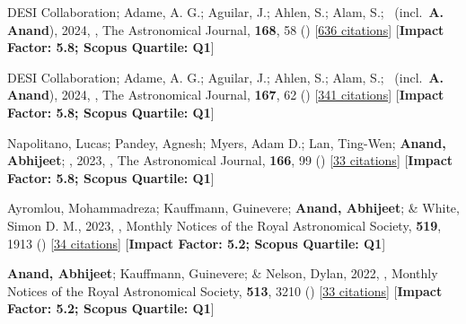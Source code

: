 \item[{\color{numcolor}\scriptsize7}] DESI Collaboration; Adame, A. G.; Aguilar, J.; Ahlen, S.; Alam, S.; \etal\ (incl.\ \textbf{A. Anand}), 2024, , The Astronomical Journal, \textbf{168}, 58 () [\href{https://ui.adsabs.harvard.edu/abs/2024AJ....168...58D}{636 citations}] [\textbf{Impact Factor: 5.8; Scopus Quartile: Q1}]

\item[{\color{numcolor}\scriptsize6}] DESI Collaboration; Adame, A. G.; Aguilar, J.; Ahlen, S.; Alam, S.; \etal\ (incl.\ \textbf{A. Anand}), 2024, , The Astronomical Journal, \textbf{167}, 62 () [\href{https://ui.adsabs.harvard.edu/abs/2024AJ....167...62D}{341 citations}] [\textbf{Impact Factor: 5.8; Scopus Quartile: Q1}]

\item[{\color{numcolor}\scriptsize5}] Napolitano, Lucas; Pandey, Agnesh; Myers, Adam D.; Lan, Ting-Wen; \textbf{Anand, Abhijeet}; \etal, 2023, , The Astronomical Journal, \textbf{166}, 99 () [\href{https://ui.adsabs.harvard.edu/abs/2023AJ....166...99N}{33 citations}] [\textbf{Impact Factor: 5.8; Scopus Quartile: Q1}]

\item[{\color{numcolor}\scriptsize4}] Ayromlou, Mohammadreza; Kauffmann, Guinevere; \textbf{Anand, Abhijeet}; \& White, Simon D. M., 2023, , Monthly Notices of the Royal Astronomical Society, \textbf{519}, 1913 () [\href{https://ui.adsabs.harvard.edu/abs/2023MNRAS.519.1913A}{34 citations}] [\textbf{Impact Factor: 5.2; Scopus Quartile: Q1}]

\item[{\color{numcolor}\scriptsize3}] \textbf{Anand, Abhijeet}; Kauffmann, Guinevere; \& Nelson, Dylan, 2022, , Monthly Notices of the Royal Astronomical Society, \textbf{513}, 3210 () [\href{https://ui.adsabs.harvard.edu/abs/2022MNRAS.513.3210A}{33 citations}] [\textbf{Impact Factor: 5.2; Scopus Quartile: Q1}]

